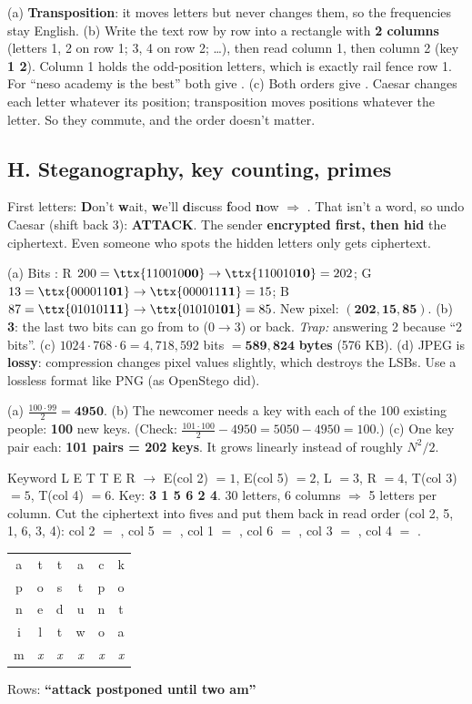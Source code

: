 \ans (a) \textbf{Transposition}: it moves letters but never changes them, so the frequencies stay English.
(b) Write the text row by row into a rectangle with \textbf{2 columns} (letters 1, 2 on row 1; 3, 4 on row 2; \dots), then read column 1, then column 2 (key \textbf{1 2}). Column 1 holds the odd-position letters, which is exactly rail fence row 1. For ``neso academy is the best'' both give .
(c) Both orders give \textbf{}. Caesar changes each letter whatever its position; transposition moves positions whatever the letter. So they commute, and the order doesn't matter.

\subsection*{H. Steganography, key counting, primes}

\ans First letters: \textbf{D}on't \textbf{w}ait, \textbf{w}e'll \textbf{d}iscuss \textbf{f}ood \textbf{n}ow $\Rightarrow$ . That isn't a word, so undo Caesar (shift back 3): \textbf{ATTACK}.
The sender \textbf{encrypted first, then hid} the ciphertext. Even someone who spots the hidden letters only gets ciphertext.

\ans (a) Bits :
R $200 = \ttx{110010\textbf{00}} \to \ttx{110010\textbf{10}} = 202$;
G $13 = \ttx{000011\textbf{01}} \to \ttx{000011\textbf{11}} = 15$;
B $87 = \ttx{010101\textbf{11}} \to \ttx{010101\textbf{01}} = 85$.
New pixel: $\mathbf{(202, 15, 85)}$.
(b) \textbf{3}: the last two bits can go from  to  ($0 \to 3$) or back. \emph{Trap:} answering 2 because ``2 bits''.
(c) $1024 \cdot 768 \cdot 6 = 4{,}718{,}592$ bits $= \mathbf{589{,}824}$ \textbf{bytes} (576 KB).
(d) JPEG is \textbf{lossy}: compression changes pixel values slightly, which destroys the LSBs. Use a lossless format like PNG (as OpenStego did).

\ans (a) $\frac{100 \cdot 99}{2} = \mathbf{4950}$.
(b) The newcomer needs a key with each of the 100 existing people: \textbf{100} new keys. (Check: $\frac{101 \cdot 100}{2} - 4950 = 5050 - 4950 = 100$.)
(c) One key pair each: \textbf{101 pairs = 202 keys}. It grows linearly instead of roughly $N^2/2$.

\ans Keyword L E T T E R $\to$ E(col 2) $=1$, E(col 5) $=2$, L $=3$, R $=4$, T(col 3) $=5$, T(col 4) $=6$. Key: \textbf{3 1 5 6 2 4}.
30 letters, 6 columns $\Rightarrow$ 5 letters per column. Cut the ciphertext into fives and put them back in read order (col 2, 5, 1, 6, 3, 4):
col 2 $=$ , col 5 $=$ , col 1 $=$ , col 6 $=$ , col 3 $=$ , col 4 $=$ .
\begin{center}\small
\begin{tabular}{|cccccc|}\hline a&t&t&a&c&k\\ p&o&s&t&p&o\\ n&e&d&u&n&t\\ i&l&t&w&o&a\\ m&\textit{x}&\textit{x}&\textit{x}&\textit{x}&\textit{x}\\\hline\end{tabular}
\quad Rows: \textbf{``attack postponed until two am''}
\end{center}

